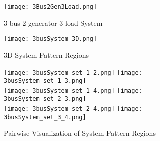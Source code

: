 \documentclass[letterpaper, 11pt]{article}
\theoremstyle{plain}
\theoremstyle{definition}
\begin{document}
\begin{figure}[htbp]
  \centering
  \texttt{[image: 3Bus2Gen3Load.png]}
  \caption{3-bus 2-generator 3-load System}
  \label{fig:3Bus2Gen3Load}
\end{figure}

\begin{figure}[htbp]
  \centering
  \texttt{[image: 3busSystem-3D.png]}
  \caption{3D System Pattern Regions}
\end{figure}

\begin{figure}[htbp]
  \centering
  \texttt{[image: 3busSystem\_set\_1\_2.png]}
  \texttt{[image: 3busSystem\_set\_1\_3.png]} \\
  \texttt{[image: 3busSystem\_set\_1\_4.png]} 
  \texttt{[image: 3busSystem\_set\_2\_3.png]} \\
  \texttt{[image: 3busSystem\_set\_2\_4.png]}
  \texttt{[image: 3busSystem\_set\_3\_4.png]}
  \caption{Pairwise Visualization of System Pattern Regions}
\end{figure}


\newpage


\end{document}
